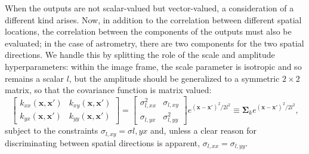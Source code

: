 \documentclass[manuscript]{aastex}
\newcommand{\bsS}{\boldsymbol\Sigma}
\begin{document}
When the outputs are not scalar-valued but vector-valued, a consideration of a different kind arises. Now, in addition to the correlation between different spatial locations, the correlation between the components of the outputs must also be evaluated; in the case of astrometry, there are two components for the two spatial directions. We handle this by splitting the role of the scale and amplitude hyperparameters: within the image frame, the scale parameter is isotropic and so remains a scalar $l$, but the amplitude should be generalized to a symmetric $2\times2$ matrix, so that the covariance function is matrix valued:
\begin{equation}
\left[\begin{array}{cc}
k_{xx}(\mathbf{x},\mathbf{x}') & k_{xy}(\mathbf{x},\mathbf{x}') \\ 
k_{yx}(\mathbf{x},\mathbf{x}') & k_{yy}(\mathbf{x},\mathbf{x}')
\end{array} \right] = 
\left[\begin{array}{cc}
\sigma_{l,xx}^2 & \sigma_{l,xy} \\
\sigma_{l,yx} & \sigma_{l,yy}^2
\end{array} \right]  e^{(\mathbf{x}-\mathbf{x}')^2/2l^2} \equiv \bsS_ke^{(\mathbf{x}-\mathbf{x}')^2/2l^2} ,
\end{equation}
subject to the constraints $\sigma_{l,xy}=\sigma{l,yx}$ and, unless a clear reason for discriminating between spatial directions is apparent, $\sigma_{l,xx}=\sigma_{l,yy}$.
\end{document}
